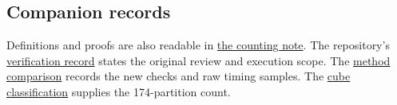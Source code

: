 \documentclass[10pt,letterpaper]{article}
\begin{document}
\subsection*{Companion records}
Definitions and proofs are also readable in
\href{https://github.com/Akhil-rav/discrete-math-lab/blob/main/notes/random_rainbow.md}{the counting note}.
The repository's
\href{https://github.com/Akhil-rav/discrete-math-lab/blob/main/results/random_rainbow_verification.md}{verification record}
states the original review and execution scope. The
\href{https://github.com/Akhil-rav/discrete-math-lab/blob/main/results/inclusion_exclusion.md}{method comparison}
records the new checks and raw timing samples. The
\href{https://github.com/Akhil-rav/discrete-math-lab/blob/main/results/cube_classification.md}{cube classification}
supplies the 174-partition count.
\end{document}
